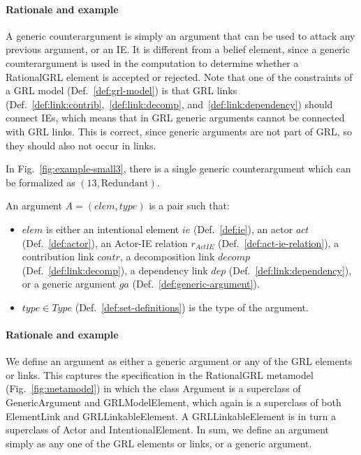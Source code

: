 \paragraph{Rationale and example} A generic counterargument is simply an argument that can be used to attack any previous argument, or an IE. It is different from a belief element, since a generic counterargument is used in the computation to determine whether a RationalGRL element is accepted or rejected. Note that one of the constraints of a GRL model (Def.~\ref{def:grl-model}) is that GRL links (Def.~\ref{def:link:contrib},~\ref{def:link:decomp}, and~\ref{def:link:dependency}) should connect IEs, which means that in GRL generic arguments cannot be connected with GRL links. This is correct, since generic arguments are not part of GRL, so they should also not occur in links. 

In Fig.~\ref{fig:example-small3}, there is a single generic counterargument which can be formalized as $(13, \text{Redundant})$.

\begin{definition}[Argument]
\label{def:argument}
An argument $A=(elem,type)$ is a pair such that:
\begin{itemize}
\item $elem$ is either an intentional element $ie$ (Def.~\ref{def:ie}), an actor $act$ (Def.~\ref{def:actor}), an Actor-IE relation $r_{ActIE}$ (Def.~\ref{def:act-ie-relation}),  a contribution link $contr$, a decomposition link $decomp$ (Def.~\ref{def:link:decomp}), a dependency link $dep$ (Def.~\ref{def:link:dependency}), or a generic argument $ga$ (Def.~\ref{def:generic-argument}).
\item $type\in Type$ (Def.~\ref{def:set-definitions}) is the type of the argument.
\end{itemize}
\end{definition}

\paragraph{Rationale and example} We define an argument as either a generic argument or any of the GRL elements or links. This captures the specification in the RationalGRL metamodel (Fig.~\ref{fig:metamodel}) in which the class \textsf{Argument} is a superclass of \textsf{GenericArgument} and \textsf{GRLModelElement}, which again is a superclass of both \textsf{ElementLink} and \textsf{GRLLinkableElement}. A \textsf{GRLLinkableElement} is in turn a superclass of \textsf{Actor} and \textsf{IntentionalElement}. In sum, we define an argument simply as any one of the GRL elements or links, or a generic argument.


